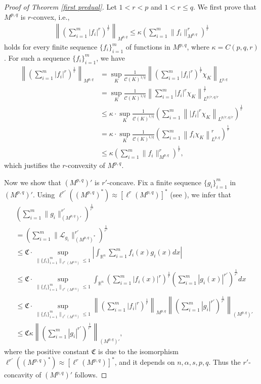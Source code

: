 \documentclass[10pt,reqno]{amsart}
\numberwithin{equation}{section}
\begin{document}
\begin{proof}[Proof of Theorem \ref{first predual}]
Let $1<r<p$ and $1<r\leq q$. We first prove that $M^{p,q}$ is $r$-convex, i.e.,
\begin{align*}
\left\|\left(\sum_{i=1}^{m}|f_{i}|^{r}\right)^{\frac{1}{r}}\right\|_{M^{p,q}}\leq\kappa\left(\sum_{i=1}^{m}\|f_{i}\|_{M^{p,q}}^{r}\right)^{\frac{1}{r}}
\end{align*}
holds for every finite sequence $\{f_{i}\}_{i=1}^{m}$ of functions in $M^{p,q}$, where $\kappa=C(p,q,r)$. For such a sequence $\{f_{i}\}_{i=1}^{m}$, we have 
\begin{align*}
\left\|\left(\sum_{i=1}^{m}|f_{i}|^{r}\right)^{\frac{1}{r}}\right\|_{M^{p,q}}&=\sup_{K}\frac{1}{\mathcal{C}(K)^{1/q}}\left\|\left(\sum_{i=1}^{m}|f_{i}|^{r}\right)^{\frac{1}{r}}\chi_{K}\right\|_{L^{p,q}}\\
&=\sup_{K}\frac{1}{\mathcal{C}(K)^{1/q}}\left\|\sum_{i=1}^{m}|f_{i}|^{r}\chi_{K}\right\|_{L^{p/r,q/r}}^{\frac{1}{r}}\\
&\leq\kappa\cdot\sup_{K}\frac{1}{\mathcal{C}(K)^{1/q}}\left(\sum_{i=1}^{m}\left\||f_{i}|^{r}\chi_{K}\right\|_{L^{p/r,q/r}}\right)^{\frac{1}{r}}\\
&=\kappa\cdot\sup_{K}\frac{1}{\mathcal{C}(K)^{1/q}}\left(\sum_{i=1}^{m}\left\|f_{i}\chi_{K}\right\|_{L^{p,q}}^{r}\right)^{\frac{1}{r}}\\
&\leq\kappa\left(\sum_{i=1}^{m}\|f_{i}\|_{M^{p,q}}^{r}\right)^{\frac{1}{r}},
\end{align*}
which justifies the $r$-convexity of $M^{p,q}$.

Now we show that $(M^{p,q})'$ is $r'$-concave. Fix a finite sequence $\{g_{i}\}_{i=1}^{m}$ in $(M^{p,q})'$. Using $\ell^{r'}((M^{p,q})^{\ast})\approx[\ell^{r}(M^{p,q})]^{\ast}$ (see \cite[Theorem 18.42]{DN}), we infer that 
\begin{align*}
&\left(\sum_{i=1}^{m}\|g_{i}\|_{(M^{p,q})'}^{r'}\right)^{\frac{1}{r'}}\\
&=\left(\sum_{i=1}^{m}\|\mathcal{L}_{g_{i}}\|_{(M^{p,q})^{\ast}}^{r'}\right)^{\frac{1}{r'}}\\
&\leq\mathfrak{C}\cdot\sup_{\|\{f_{i}\}_{i=1}^{m}\|_{\ell^{r}(M^{p,q})}\leq 1}\left|\int_{\mathbb{R}^{n}}\sum_{i=1}^{m}f_{i}(x)g_{i}(x)dx\right|\\
&\leq\mathfrak{C}\cdot\sup_{\|\{f_{i}\}_{i=1}^{m}\|_{\ell^{r}(M^{p,q})}\leq 1}\int_{\mathbb{R}^{n}}\left(\sum_{i=1}^{m}|f_{i}(x)|^{r}\right)^{\frac{1}{r}}\left(\sum_{i=1}^{m}|g_{i}(x)|^{r'}\right)^{\frac{1}{r'}}dx\\
&\leq\mathfrak{C}\cdot\sup_{\|\{f_{i}\}_{i=1}^{m}\|_{\ell^{r}(M^{p,q})}\leq 1}\left\|\left(\sum_{i=1}^{m}|f_{i}|^{r}\right)^{\frac{1}{r}}\right\|_{M^{p,q}}\left\|\left(\sum_{i=1}^{m}|g_{i}|^{r'}\right)^{\frac{1}{r'}}\right\|_{(M^{p,q})'}\\
&\leq\mathfrak{C}\kappa\left\|\left(\sum_{i=1}^{m}|g_{i}|^{r'}\right)^{\frac{1}{r'}}\right\|_{(M^{p,q})'},
\end{align*}
where the positive constant $\mathfrak{C}$ is due to the isomorphism $\ell^{r'}((M^{p,q})^{\ast})\approx[\ell^{r}(M^{p,q})]^{\ast}$, and it depends on $n,\alpha,s,p,q$. Thus the $r'$-concavity of $(M^{p,q})'$ follows.


\end{proof}
\end{document}
